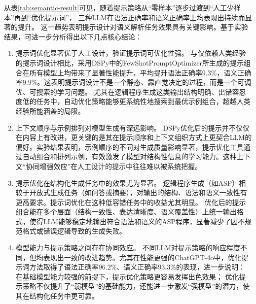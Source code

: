 从表\ref{tab:semantic-result}可见，随着提示策略从“零样本”逐步过渡到“人工少样本”再到“优化提示词”，
三种LLM在语法正确率和语义正确率上均表现出持续而显著的提升。
这一趋势表明提示设计对语义解析任务效果具有关键影响。基于实验结果，可进一步分析得出以下几点核心结论：
\begin{enumerate}[nosep]
\item 提示词优化显著优于人工设计，验证提示词可优化性强。
与仅依赖人类经验的提示词设计相比，采用DSPy中的FewShotPromptOptimizer所生成的提示组合在所有模型上均带来了显著性能提升，平均提升语法正确率9.3\%，语义正确率9.9\%。这表明提示词设计不是一个静态、靠直觉决定的过程，而是一个可调优、可搜索的学习问题。
尤其在逻辑程序生成这类输出结构明确、出错容忍度低的任务中，自动优化策略能够更系统性地搜索到最优示例组合，超越人类经验所能涵盖的局限。
\item 上下文顺序与示例排列对模型生成有深远影响。
DSPy优化后的提示并不仅仅在内容上有改进，更关键的是其在提示顺序和上下文组织方式上更契合LLM的偏好。实验结果表明，示例顺序的不同对生成质量影响显著，提示优化工具通过自动组合和排列示例，有效激发了模型对结构性信息的学习能力。这种上下文“协同增强效应”在人工设计的提示中往往难以被系统把握。
\item 提示优化在结构化生成任务中的效果尤为显著。
逻辑程序生成（如ASP）相较于开放式生成任务（如问答或摘要），对输出的结构、语法和语义一致性有更高要求。提示词优化在这种低容错任务中的收益尤其明显。
优化后的提示组合能在多个层面（结构一致性、表达清晰度、语义覆盖性）上统一输出格式，使得LLM能够稳定地输出符合语法和语义的ASP程序，显著减少了因不规范格式或错误逻辑导致的生成失败。
\item 模型能力与提示策略之间存在协同效应。
不同LLM对提示策略的响应程度不同，但均表现出一致的改进趋势。尤其在性能更强的ChatGPT-4o中，优化提示词方法取得了语法正确率96.2\%、语义正确率93.3\%的表现，进一步说明：
在基础模型能力较强的前提下，提示优化策略更容易发挥出色效果；
优化提示策略不仅提升了“弱模型”的基础能力，还能进一步激发“强模型”的潜力，使其在结构化任务中更可靠。
\end{enumerate}
